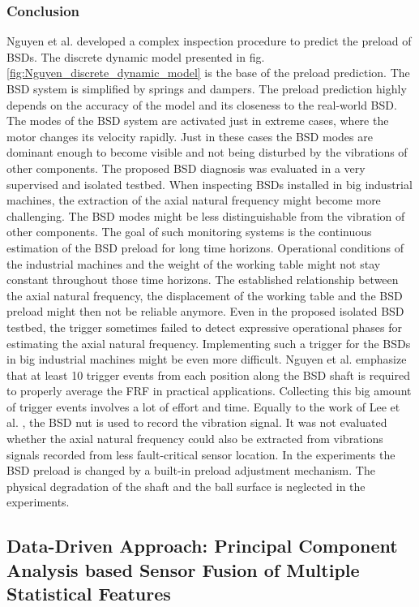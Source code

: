 \subsubsection{Conclusion}
Nguyen et al. \cite{NGUYEN2019} developed a complex inspection procedure to predict the preload of BSDs. The discrete dynamic model presented in fig. \ref{fig:Nguyen_discrete_dynamic_model} is the base of the preload prediction. The BSD system is simplified by springs and dampers. The preload prediction highly depends on the accuracy of the model and its closeness to the real-world BSD. The modes of the BSD system are activated just in extreme cases, where the motor changes its velocity rapidly. Just in these cases the BSD modes are dominant enough to become visible and not being disturbed by the vibrations of other components. The proposed BSD diagnosis was evaluated in a very supervised and isolated testbed. When inspecting BSDs installed in big industrial machines, the extraction of the axial natural frequency might become more challenging. The BSD modes might be less distinguishable from the vibration of other components. The goal of such monitoring systems is the continuous estimation of the BSD preload for long time horizons. Operational conditions of the industrial machines and the weight of the working table might not stay constant throughout those time horizons. The established relationship between the axial natural frequency, the displacement of the working table and the BSD preload might then not be reliable anymore. Even in the proposed isolated BSD testbed, the trigger sometimes failed to detect expressive operational phases for estimating the axial natural frequency. Implementing such a trigger for the BSDs in big industrial machines might be even more difficult. Nguyen et al. emphasize that at least 10 trigger events from each position along the BSD shaft is required to properly average the FRF in practical applications. Collecting this big amount of trigger events involves a lot of effort and time. Equally to the work of Lee et al. \cite{Lee2015}, the BSD nut is used to record the vibration signal. It was not evaluated whether the axial natural frequency could also be extracted from vibrations signals recorded from less fault-critical sensor location. In the experiments the BSD preload is changed by a built-in preload adjustment mechanism. The physical degradation of the shaft and the ball surface is neglected in the experiments.

\subsection{Data-Driven Approach: Principal Component Analysis based Sensor Fusion of Multiple Statistical Features}


